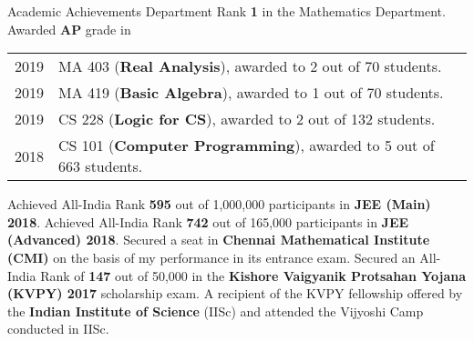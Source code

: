 \begin{rubric}{Academic Achievements}
\entry*[2021]%
	Department Rank \textbf{1} in the Mathematics Department.
    \entry* Awarded \textbf{AP} grade in
        
    \begin{tabular}{@{}ll}
       2019 & MA 403 (\textbf{Real Analysis}), awarded to 2 out of 70 students. \\
       2019 & MA 419 (\textbf{Basic Algebra}), awarded to 1 out of 70 students. \\
       2019 & CS 228 (\textbf{Logic for CS}), awarded to 2 out of 132 students. \\
       2018 & CS 101 (\textbf{Computer Programming}), awarded to 5 out of 663 students. \\
    \end{tabular}
    \entry*[2018] Achieved All-India Rank \textbf{595} out of 1,000,000 participants in \textbf{JEE (Main) 2018}.
    \entry*[2018] Achieved All-India Rank \textbf{742} out of 165,000 participants in \textbf{JEE (Advanced) 2018}.
    \entry*[2018] Secured a seat in \textbf{Chennai Mathematical Institute (CMI)} on the basis of my performance in its entrance exam.
    \entry*[2017] Secured an All-India Rank of \textbf{147} out of 50,000 in the \textbf{Kishore Vaigyanik Protsahan Yojana (KVPY) 2017} scholarship exam.
    \entry*[2018] A recipient of the KVPY fellowship offered by the \textbf{Indian Institute of Science} (IISc) and attended the Vijyoshi Camp conducted in IISc.
\end{rubric}
